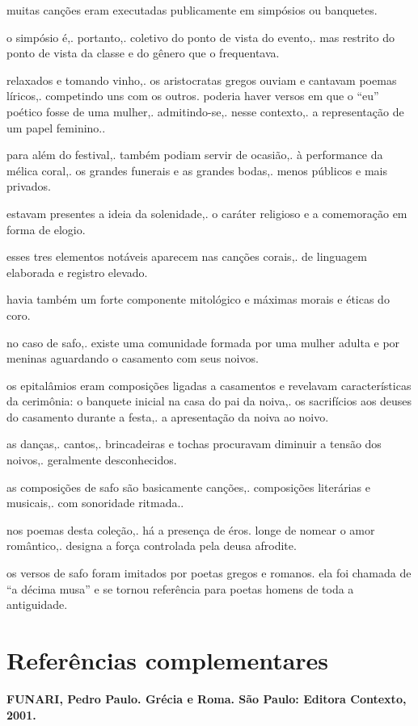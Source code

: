 \documentclass[12pt]{extarticle}
\begin{document}
muitas canções eram executadas publicamente em simpósios ou banquetes.


o simpósio é,. portanto,. coletivo do ponto de vista do evento,. mas
restrito do ponto de vista da classe e do gênero que o frequentava.


relaxados e tomando vinho,. os aristocratas gregos ouviam e cantavam
poemas líricos,. competindo uns com os outros. poderia haver versos em
que o ``eu'' poético fosse de uma mulher,. admitindo-se,. nesse
contexto,. a representação de um papel feminino..

para além do festival,. também podiam servir de ocasião,. à performance
da mélica coral,. os grandes funerais e as grandes bodas,. menos
públicos e mais privados.


estavam presentes a ideia da solenidade,. o caráter religioso e a
comemoração em forma de elogio.


esses tres elementos notáveis aparecem nas canções corais,. de linguagem
elaborada e registro elevado.


havia também um forte componente mitológico e máximas morais e éticas do
coro.


no caso de safo,. existe uma comunidade formada por uma mulher adulta e
por meninas aguardando o casamento com seus noivos.


os epitalâmios eram composições ligadas a casamentos e revelavam
características da cerimônia: o banquete inicial na casa do pai da
noiva,. os sacrifícios aos deuses do casamento durante a festa,. a
apresentação da noiva ao noivo.


as danças,. cantos,. brincadeiras e tochas procuravam diminuir a tensão
dos noivos,. geralmente desconhecidos.

as composições de safo são basicamente canções,. composições literárias
e musicais,. com sonoridade ritmada..


nos poemas desta coleção,. há a presença de éros. longe de nomear o amor
romântico,. designa a força controlada pela deusa afrodite.


os versos de safo foram imitados por poetas gregos e romanos. ela foi
chamada de ``a décima musa'' e se tornou referência para poetas homens
de toda a antiguidade.


\section{Referências complementares}

\textbf{FUNARI, Pedro Paulo. Grécia e Roma. São Paulo: Editora Contexto,
2001.}
\end{document}
